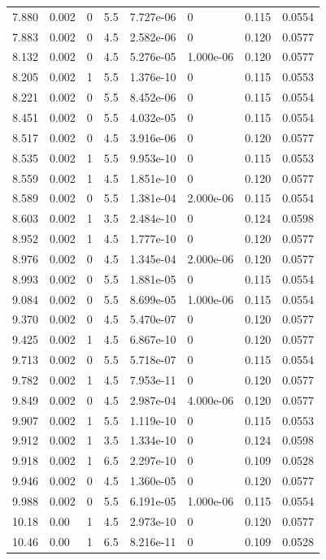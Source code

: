 \documentclass[preview]{standalone}
\begin{document}
{{{\begin{tabular}{L{1.2cm}C{1.2cm} C{0.3cm}C{0.5cm} C{1.4cm}C{1.4cm} C{1.4cm}C{1.4cm}}
  7.880  &  0.002  & 0     & 5.5 &  7.727e-06  & 0  & 0.115 &  0.0554   \\ 
  7.883  &  0.002  & 0     & 4.5 &  2.582e-06  & 0  & 0.120 &  0.0577   \\ 
  8.132  &  0.002  & 0     & 4.5 &  5.276e-05  & 1.000e-06  & 0.120 &  0.0577   \\ 
  8.205  &  0.002  & 1     & 5.5 &  1.376e-10  & 0  & 0.115 &  0.0553   \\ 
  8.221  &  0.002  & 0     & 5.5 &  8.452e-06  & 0  & 0.115 &  0.0554   \\ 
  8.451  &  0.002  & 0     & 5.5 &  4.032e-05  & 0  & 0.115 &  0.0554   \\ 
  8.517  &  0.002  & 0     & 4.5 &  3.916e-06  & 0  & 0.120 &  0.0577   \\ 
  8.535  &  0.002  & 1     & 5.5 &  9.953e-10  & 0  & 0.115 &  0.0553   \\ 
  8.559  &  0.002  & 1     & 4.5 &  1.851e-10  & 0  & 0.120 &  0.0577   \\ 
  8.589  &  0.002  & 0     & 5.5 &  1.381e-04  & 2.000e-06  & 0.115 &  0.0554   \\ 
  8.603  &  0.002  & 1     & 3.5 &  2.484e-10  & 0  & 0.124 &  0.0598   \\ 
  8.952  &  0.002  & 1     & 4.5 &  1.777e-10  & 0  & 0.120 &  0.0577   \\ 
  8.976  &  0.002  & 0     & 4.5 &  1.345e-04  & 2.000e-06  & 0.120 &  0.0577   \\ 
  8.993  &  0.002  & 0     & 5.5 &  1.881e-05  & 0  & 0.115 &  0.0554   \\ 
  9.084  &  0.002  & 0     & 5.5 &  8.699e-05  & 1.000e-06  & 0.115 &  0.0554   \\ 
  9.370  &  0.002  & 0     & 4.5 &  5.470e-07  & 0  & 0.120 &  0.0577   \\ 
  9.425  &  0.002  & 1     & 4.5 &  6.867e-10  & 0  & 0.120 &  0.0577   \\ 
  9.713  &  0.002  & 0     & 5.5 &  5.718e-07  & 0  & 0.115 &  0.0554   \\ 
  9.782  &  0.002  & 1     & 4.5 &  7.953e-11  & 0  & 0.120 &  0.0577   \\ 
  9.849  &  0.002  & 0     & 4.5 &  2.987e-04  & 4.000e-06  & 0.120 &  0.0577   \\ 
  9.907  &  0.002  & 1     & 5.5 &  1.119e-10  & 0  & 0.115 &  0.0553   \\ 
  9.912  &  0.002  & 1     & 3.5 &  1.334e-10  & 0  & 0.124 &  0.0598   \\ 
  9.918  &  0.002  & 1     & 6.5 &  2.297e-10  & 0  & 0.109 &  0.0528   \\ 
  9.946  &  0.002  & 0     & 4.5 &  1.360e-05  & 0  & 0.120 &  0.0577   \\ 
  9.988  &  0.002  & 0     & 5.5 &  6.191e-05  & 1.000e-06  & 0.115 &  0.0554   \\ 
  10.18  &  0.00  & 1     & 4.5 &  2.973e-10  & 0  & 0.120 &  0.0577   \\ 
  10.46  &  0.00  & 1     & 6.5 &  8.216e-11  & 0  & 0.109 &  0.0528   \\ 
\hline 
\end{tabular} 

}}}
\end{document}
